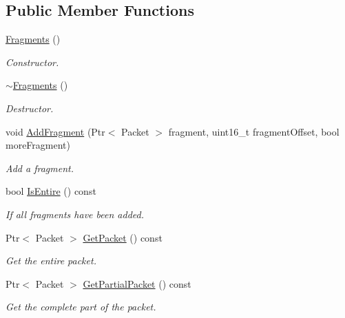 \subsection*{Public Member Functions}
\begin{DoxyCompactItemize}
\item 
\hyperlink{classns3_1_1Ipv4RouterL3Protocol_1_1Fragments_a79843dcefae495214fd0409216c752bb}{Fragments} ()
\begin{DoxyCompactList}\small\item\em Constructor. \end{DoxyCompactList}\item 
\hyperlink{classns3_1_1Ipv4RouterL3Protocol_1_1Fragments_aaef0bfaf9061b6a19f27a438fc20f3ae}{$\sim$\-Fragments} ()
\begin{DoxyCompactList}\small\item\em Destructor. \end{DoxyCompactList}\item 
void \hyperlink{classns3_1_1Ipv4RouterL3Protocol_1_1Fragments_a5d4cc40fc1ba11c52024f674bdc1ddb7}{Add\-Fragment} (Ptr$<$ Packet $>$ fragment, uint16\-\_\-t fragment\-Offset, bool more\-Fragment)
\begin{DoxyCompactList}\small\item\em Add a fragment. \end{DoxyCompactList}\item 
bool \hyperlink{classns3_1_1Ipv4RouterL3Protocol_1_1Fragments_a1800010de516168a088838f33d7ad1c7}{Is\-Entire} () const 
\begin{DoxyCompactList}\small\item\em If all fragments have been added. \end{DoxyCompactList}\item 
Ptr$<$ Packet $>$ \hyperlink{classns3_1_1Ipv4RouterL3Protocol_1_1Fragments_a6d46b37853fb6275e7ee17cc011df935}{Get\-Packet} () const 
\begin{DoxyCompactList}\small\item\em Get the entire packet. \end{DoxyCompactList}\item 
Ptr$<$ Packet $>$ \hyperlink{classns3_1_1Ipv4RouterL3Protocol_1_1Fragments_a66b105030585bb6e71cffd8a4990a510}{Get\-Partial\-Packet} () const 
\begin{DoxyCompactList}\small\item\em Get the complete part of the packet. \end{DoxyCompactList}\end{DoxyCompactItemize}
